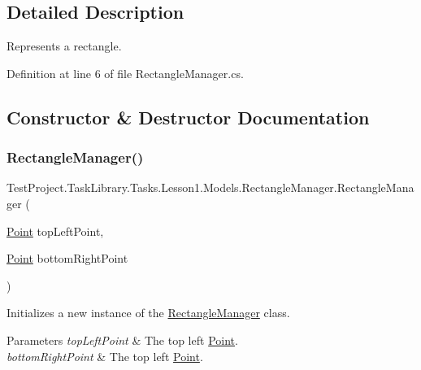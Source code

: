 \subsection{Detailed Description}
Represents a rectangle. 



Definition at line 6 of file Rectangle\+Manager.\+cs.



\subsection{Constructor \& Destructor Documentation}
\mbox{\label{class_test_project_1_1_task_library_1_1_tasks_1_1_lesson1_1_1_models_1_1_rectangle_manager_ad733f405be87493a28168cd137eec1f3}} 
\subsubsection{\texorpdfstring{RectangleManager()}{RectangleManager()}}
{\footnotesize\ttfamily Test\+Project.\+Task\+Library.\+Tasks.\+Lesson1.\+Models.\+Rectangle\+Manager.\+Rectangle\+Manager (\begin{DoxyParamCaption}\item[{\mbox{\hyperlink{class_test_project_1_1_task_library_1_1_tasks_1_1_lesson1_1_1_models_1_1_point}{Point}}}]{top\+Left\+Point,  }\item[{\mbox{\hyperlink{class_test_project_1_1_task_library_1_1_tasks_1_1_lesson1_1_1_models_1_1_point}{Point}}}]{bottom\+Right\+Point }\end{DoxyParamCaption})}



Initializes a new instance of the \mbox{\hyperlink{class_test_project_1_1_task_library_1_1_tasks_1_1_lesson1_1_1_models_1_1_rectangle_manager}{Rectangle\+Manager}} class. 


\begin{DoxyParams}{Parameters}
{\em top\+Left\+Point} & The top left \mbox{\hyperlink{class_test_project_1_1_task_library_1_1_tasks_1_1_lesson1_1_1_models_1_1_point}{Point}}.\\
\hline
{\em bottom\+Right\+Point} & The top left \mbox{\hyperlink{class_test_project_1_1_task_library_1_1_tasks_1_1_lesson1_1_1_models_1_1_point}{Point}}.\\
\hline
\end{DoxyParams}


